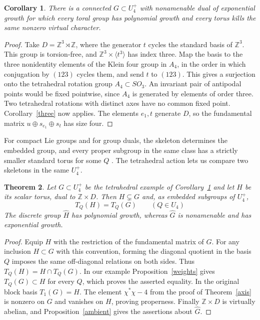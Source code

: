 \documentclass[11pt,a4paper]{article}
\newtheorem{thm}{Theorem}[section]
\newtheorem{cor}[thm]{Corollary}
\theoremstyle{remark}
\begin{document}
\begin{cor}\label{tetra}
There is a connected $G\subset U_4^+$ with nonamenable dual of exponential
growth for which every toral group has polynomial growth and every torus
kills the same nonzero virtual character.
\end{cor}
\begin{proof}
Take $D=\mathbb Z^3\rtimes\mathbb Z$, where the generator $t$ cycles the
standard basis of $\mathbb Z^3$. This group is torsion-free, and
$\mathbb Z^3\times\langle t^3\rangle$ has index three. Map the basis to
the three nonidentity elements of the Klein four group in $A_4$, in the
order in which conjugation by $(123)$ cycles them, and send $t$ to $(123)$.
This gives a surjection onto the tetrahedral rotation group $A_4\subset SO_3$.
An invariant pair of antipodal points would be fixed pointwise, since
$A_4$ is generated by elements of order three. Two tetrahedral rotations
with distinct axes have no common fixed point. Corollary~\ref{three} now
applies. The elements $e_1,t$ generate $D$, so the fundamental matrix
$u\oplus s_{e_1}\oplus s_t$ has size four.
\end{proof}

For compact Lie groups and for group duals, the skeleton determines the
embedded group, and every proper subgroup in the same class has a strictly
smaller standard torus for some $Q$ \cite[Theorem~13.12]{qg}.
The tetrahedral action lets us compare two skeletons in the same $U_4^+$.

\begin{thm}\label{skeleton}
Let $G\subset U_4^+$ be the tetrahedral example of Corollary~\ref{tetra}
and let $H$ be its scalar torus, dual to $\mathbb Z\times D$. Then
$H\subsetneq G$ and, as embedded subgroups of $U_4^+$,
\[
 T_Q(H)=T_Q(G)\qquad(Q\in U_4)
\]
The discrete group $\widehat H$ has polynomial growth, whereas
$\widehat G$ is nonamenable and has exponential growth.
\end{thm}
\begin{proof}
Equip $H$ with the restriction of the fundamental matrix of $G$.
For any inclusion $H\subset G$ with this convention, forming the
diagonal quotient in the basis $Q$ imposes the same off-diagonal
relations on both sides. Thus $T_Q(H)=H\cap T_Q(G)$. In our example
Proposition~\ref{weights} gives $T_Q(G)\subset H$ for every $Q$, which
proves the asserted equality. In the original block basis $T_1(G)=H$.
The element $\chi^*\chi-4$ from
the proof of Theorem~\ref{axis} is nonzero on $G$ and vanishes on $H$,
proving properness. Finally $\mathbb Z\times D$ is virtually abelian,
and Proposition~\ref{ambient} gives the assertions about $\widehat G$.
\end{proof}
\end{document}
